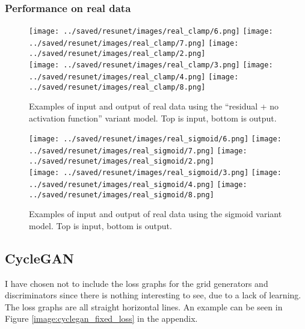 \subsubsection{Performance on real data}

\begin{figure}[H]
  \centering
  \captionsetup{justification=centering}
  \texttt{[image: ../saved/resunet/images/real\_clamp/6.png]}
  \texttt{[image: ../saved/resunet/images/real\_clamp/7.png]}
  \texttt{[image: ../saved/resunet/images/real\_clamp/2.png]}\\
  \texttt{[image: ../saved/resunet/images/real\_clamp/3.png]}
  \texttt{[image: ../saved/resunet/images/real\_clamp/4.png]}
  \texttt{[image: ../saved/resunet/images/real\_clamp/8.png]}
  \caption[center]{Examples of input and output of real data using the ``residual + no activation function'' variant model. Top is input, bottom is output.}\label{image:resunet_real_clamp_images}
\end{figure}

\begin{figure}[H]
  \centering
  \captionsetup{justification=centering}
  \texttt{[image: ../saved/resunet/images/real\_sigmoid/6.png]}
  \texttt{[image: ../saved/resunet/images/real\_sigmoid/7.png]}
  \texttt{[image: ../saved/resunet/images/real\_sigmoid/2.png]}\\
  \texttt{[image: ../saved/resunet/images/real\_sigmoid/3.png]}
  \texttt{[image: ../saved/resunet/images/real\_sigmoid/4.png]}
  \texttt{[image: ../saved/resunet/images/real\_sigmoid/8.png]}
  \caption[center]{Examples of input and output of real data using the sigmoid variant model. Top is input, bottom is output.}\label{image:resunet_real_sigmoid_images}
\end{figure}

\subsection{CycleGAN}
I have chosen not to include the loss graphs for the grid generators and discriminators since there is nothing interesting to see, due to a lack of learning. The loss graphs are all straight horizontal lines. An example can be seen in Figure \ref{image:cyclegan_fixed_loss} in the appendix.
